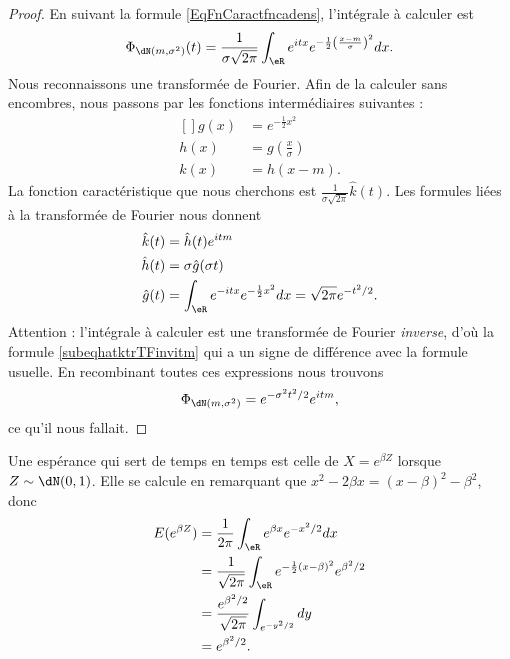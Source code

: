 \begin{proof}
	En suivant la formule \eqref{EqFnCaractfncadens}, l'intégrale à calculer est
	\begin{equation}
		\Phi_{\dN(m,\sigma^2)}(t)=\frac{1}{ \sigma\sqrt{2\pi} }\int_{\eR} e^{itx} e^{-\frac{ 1 }{2}\left( \frac{ x-m }{ \sigma } \right)^2}dx.
	\end{equation}
	Nous reconnaissons une transformée de Fourier. Afin de la calculer sans encombres, nous passons par les fonctions intermédiaires suivantes :
	\begin{equation}
		\begin{aligned}[]
			g(x) & = e^{-\frac{ 1 }{2}x^2}               \\
			h(x) & =g\left( \frac{ x }{ \sigma } \right) \\
			k(x) & =h(x-m).
		\end{aligned}
	\end{equation}
	La fonction caractéristique que nous cherchons est \( \frac{1}{ \sigma\sqrt{2\pi} }\hat k(t)\). Les formules liées à la transformée de Fourier nous donnent
	\begin{subequations}
		\begin{align}
			\hat k(t) & =\hat h(t) e^{itm}    \label{subeqhatktrTFinvitm}                    \\
			\hat h(t) & =\sigma\hat g(\sigma t)                                              \\
			\hat g(t) & =\int_{\eR} e^{-itx} e^{-\frac{ 1 }{2}x^2}dx=\sqrt{2\pi} e^{-t^2/2}.
		\end{align}
	\end{subequations}
	Attention : l'intégrale à calculer est une transformée de Fourier \emph{inverse}, d'où la formule \eqref{subeqhatktrTFinvitm} qui a un signe de différence avec la formule usuelle. En recombinant toutes ces expressions nous trouvons
	\begin{equation}
		\Phi_{\dN(m,\sigma^2)}= e^{-\sigma^2t^2/2} e^{itm},
	\end{equation}
	ce qu'il nous fallait.
\end{proof}

\begin{example}
	Une espérance qui sert de temps en temps est celle de \( X= e^{\beta Z}\) lorsque \( Z\sim\dN(0,1)\). Elle se calcule en remarquant que \( x^2-2\beta x=(x-\beta)^2-\beta^2\), donc
	\begin{subequations}        \label{EqEspexpbetaZnorm}
		\begin{align}
			E( e^{\beta Z}) & =\frac{1}{ 2\pi }\int_{\eR} e^{\beta x} e^{-x^2/2}dx                           \\
			                & =\frac{1}{ \sqrt{2\pi} }\int_{\eR} e^{-\frac{ 1 }{2}(x-\beta)^2} e^{\beta^2/2} \\
			                & =\frac{  e^{\beta^2/2} }{ \sqrt{2\pi} }\int_{ e^{-y^2/2}}dy                    \\
			                & = e^{\beta^2/2}.
		\end{align}
	\end{subequations}
\end{example}


